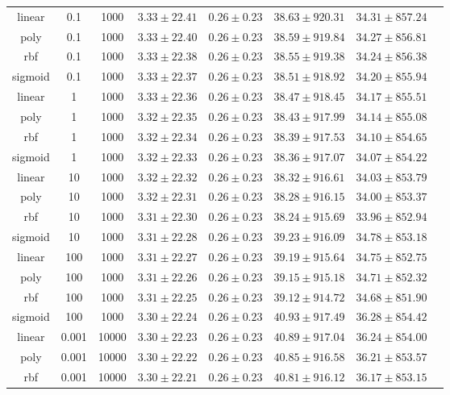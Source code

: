 \begin{tabular}{cccrrrrr}
linear & 0.1 & 1000 & $3.33 \pm 22.41$ & $0.26 \pm 0.23$ & $38.63 \pm 920.31$ & $34.31 \pm 857.24$\\
poly & 0.1 & 1000 & $3.33 \pm 22.40$ & $0.26 \pm 0.23$ & $38.59 \pm 919.84$ & $34.27 \pm 856.81$\\
rbf & 0.1 & 1000 & $3.33 \pm 22.38$ & $0.26 \pm 0.23$ & $38.55 \pm 919.38$ & $34.24 \pm 856.38$\\
sigmoid & 0.1 & 1000 & $3.33 \pm 22.37$ & $0.26 \pm 0.23$ & $38.51 \pm 918.92$ & $34.20 \pm 855.94$\\
linear & 1 & 1000 & $3.33 \pm 22.36$ & $0.26 \pm 0.23$ & $38.47 \pm 918.45$ & $34.17 \pm 855.51$\\
poly & 1 & 1000 & $3.32 \pm 22.35$ & $0.26 \pm 0.23$ & $38.43 \pm 917.99$ & $34.14 \pm 855.08$\\
rbf & 1 & 1000 & $3.32 \pm 22.34$ & $0.26 \pm 0.23$ & $38.39 \pm 917.53$ & $34.10 \pm 854.65$\\
sigmoid & 1 & 1000 & $3.32 \pm 22.33$ & $0.26 \pm 0.23$ & $38.36 \pm 917.07$ & $34.07 \pm 854.22$\\
linear & 10 & 1000 & $3.32 \pm 22.32$ & $0.26 \pm 0.23$ & $38.32 \pm 916.61$ & $34.03 \pm 853.79$\\
poly & 10 & 1000 & $3.32 \pm 22.31$ & $0.26 \pm 0.23$ & $38.28 \pm 916.15$ & $34.00 \pm 853.37$\\
rbf & 10 & 1000 & $3.31 \pm 22.30$ & $0.26 \pm 0.23$ & $38.24 \pm 915.69$ & $33.96 \pm 852.94$\\
sigmoid & 10 & 1000 & $3.31 \pm 22.28$ & $0.26 \pm 0.23$ & $39.23 \pm 916.09$ & $34.78 \pm 853.18$\\
linear & 100 & 1000 & $3.31 \pm 22.27$ & $0.26 \pm 0.23$ & $39.19 \pm 915.64$ & $34.75 \pm 852.75$\\
poly & 100 & 1000 & $3.31 \pm 22.26$ & $0.26 \pm 0.23$ & $39.15 \pm 915.18$ & $34.71 \pm 852.32$\\
rbf & 100 & 1000 & $3.31 \pm 22.25$ & $0.26 \pm 0.23$ & $39.12 \pm 914.72$ & $34.68 \pm 851.90$\\
sigmoid & 100 & 1000 & $3.30 \pm 22.24$ & $0.26 \pm 0.23$ & $40.93 \pm 917.49$ & $36.28 \pm 854.42$\\
linear & 0.001 & 10000 & $3.30 \pm 22.23$ & $0.26 \pm 0.23$ & $40.89 \pm 917.04$ & $36.24 \pm 854.00$\\
poly & 0.001 & 10000 & $3.30 \pm 22.22$ & $0.26 \pm 0.23$ & $40.85 \pm 916.58$ & $36.21 \pm 853.57$\\
rbf & 0.001 & 10000 & $3.30 \pm 22.21$ & $0.26 \pm 0.23$ & $40.81 \pm 916.12$ & $36.17 \pm 853.15$\\

\end{tabular}
